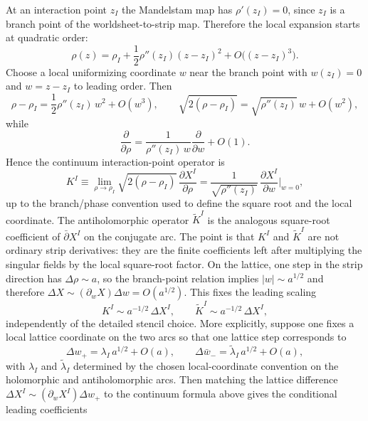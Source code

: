 \documentclass[11pt]{article}
\numberwithin{equation}{section}
\begin{document}
At an interaction point $z_I$ the Mandelstam map has $\rho'(z_I)=0$, since $z_I$ is a branch point of the worldsheet-to-strip map. Therefore the local expansion starts at quadratic order:
\begin{equation}
\label{eq:s14-009}
\rho(z)=\rho_I+\frac12 \rho''(z_I)(z-z_I)^2+O\!\bigl((z-z_I)^3\bigr).
\end{equation}
\noindent
Choose a local uniformizing coordinate $w$ near the branch point with $w(z_I)=0$ and $w=z-z_I$ to leading order. Then
\begin{equation}
\label{eq:s14-010}
\rho-\rho_I=\frac12 \rho''(z_I)\,w^2+O(w^3),
\qquad
\sqrt{2(\rho-\rho_I)}=\sqrt{\rho''(z_I)}\,w+O(w^2),
\end{equation}
while
\begin{equation}
\label{eq:s14-011}
\frac{\partial}{\partial \rho}
=
\frac{1}{\rho''(z_I)\,w}\frac{\partial}{\partial w}
+O(1).
\end{equation}
Hence the continuum interaction-point operator is
\begin{equation}
\label{eq:s14-012}
K^I
\equiv
\lim_{\rho\to\rho_I}\sqrt{2(\rho-\rho_I)}\,\frac{\partial X^I}{\partial \rho}
=
\frac{1}{\sqrt{\rho''(z_I)}}\,
\frac{\partial X^I}{\partial w}\Big|_{w=0},
\end{equation}
up to the branch/phase convention used to define the square root and the local coordinate. The antiholomorphic operator $\widetilde K^I$ is the analogous square-root coefficient of $\bar\partial X^I$ on the conjugate arc. The point is that $K^I$ and $\widetilde K^I$ are not ordinary strip derivatives: they are the finite coefficients left after multiplying the singular fields by the local square-root factor. On the lattice, one step in the strip direction has $\Delta \rho\sim a$, so the branch-point relation implies $|w|\sim a^{1/2}$ and therefore $\Delta X\sim (\partial_w X)\Delta w=O(a^{1/2})$. This fixes the leading scaling
\begin{equation}
\label{eq:s14-013}
K^I \sim a^{-1/2}\,\Delta X^I,
\qquad
\widetilde K^I \sim a^{-1/2}\,\Delta X^I,
\end{equation}
independently of the detailed stencil choice.
More explicitly, suppose one fixes a local lattice coordinate on the two arcs so that one lattice step corresponds to
\begin{equation}
\label{eq:s14-014}
\Delta w_+ = \lambda_I\,a^{1/2}+O(a),
\qquad
\Delta \bar w_- = \widetilde\lambda_I\,a^{1/2}+O(a),
\end{equation}
with $\lambda_I$ and $\widetilde\lambda_I$ determined by the chosen local-coordinate convention on the holomorphic and antiholomorphic arcs. Then matching the lattice difference $\Delta X^I \sim (\partial_w X^I)\Delta w_+$ to the continuum formula above gives the conditional leading coefficients
\end{document}
